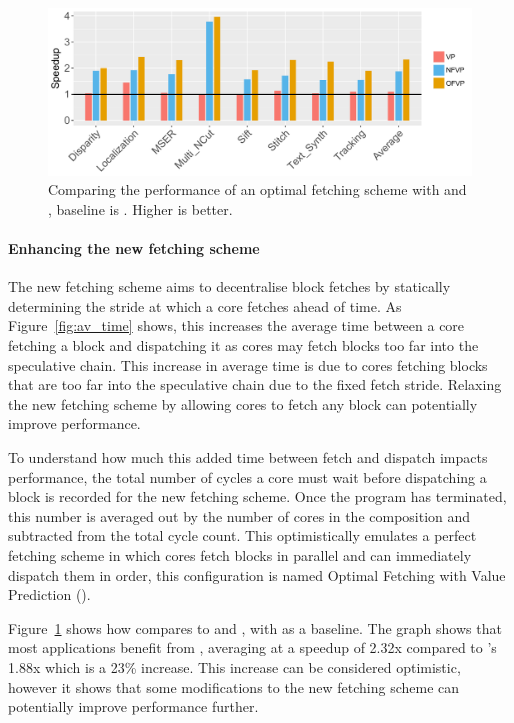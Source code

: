 
\begin{figure}[t]
    \centering
    \includegraphics[width=1\textwidth]{chapter3/graphics/opt_res2.pdf}
    \caption{Comparing the performance of an optimal fetching scheme with \vp{} and \nfvp{}, baseline is \novp. Higher is better.}
    \label{fig:opt_scheme}
	\vspace{1em}
\end{figure}

\paragraph*{Enhancing the new fetching scheme}

The new fetching scheme aims to decentralise block fetches by statically determining the stride at which a core fetches ahead of time.
As Figure~\ref{fig:av_time} shows, this increases the average time between a core fetching a block and dispatching it as cores may fetch blocks too far into the speculative chain.
This increase in average time is due to cores fetching blocks that are too far into the speculative chain due to the fixed fetch stride.
Relaxing the new fetching scheme by allowing cores to fetch any block can potentially improve performance.

To understand how much this added time between fetch and dispatch impacts performance, the total number of cycles a core must wait before dispatching a block is recorded for the new fetching scheme.
Once the program has terminated, this number is averaged out by the number of cores in the composition and subtracted from the total cycle count.
This optimistically emulates a perfect fetching scheme in which cores fetch blocks in parallel and can immediately dispatch them in order, this configuration is named Optimal Fetching with Value Prediction (\optvp).

Figure~\ref{fig:opt_scheme} shows how \optvp{} compares to \vp{} and \nfvp{}, with \novp{} as a baseline.
The graph shows that most applications benefit from \optvp{}, averaging at a speedup of 2.32x compared to \nfvp's 1.88x which is a 23\% increase.
This increase can be considered optimistic, however it shows that some modifications to the new fetching scheme can potentially improve performance further.

